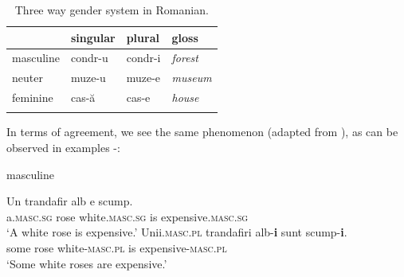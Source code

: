 \begin{table}[!htpb]
  \centering
  \begin{tabular}{llll}
    \lsptoprule
              & singular                   & plural                    & gloss           \\
    \midrule
    masculine & \cellcolor{gray!25}condr-u & condr-i                    & \textit{forest} \\
    neuter    & \cellcolor{gray!25}muze-u  & \cellcolor{gray!25}muze-e & \textit{museum} \\
    feminine  & cas-ă                      & \cellcolor{gray!25}cas-e  & \textit{house}  \\
    \lspbottomrule
  \end{tabular}
  \caption{Three way gender system in Romanian.}\label{tab:gender-rom}
\end{table}

In terms of agreement, we see the same phenomenon (adapted from \citealt{Farkas.1990}), as can be observed in examples -:

\begin{exe}
    \ex \label{romanian-masc-exe} masculine
    \begin{xlist}
        \ex 
        \gll Un trandafir alb e scump.\\
        a.\textsc{masc.sg} rose white.\textsc{masc.sg} is expensive.\textsc{masc.sg}\\
        \glt `A white rose is expensive.'
        \ex 
        \gll Unii.\textsc{masc.pl} trandafiri alb-\textbf{i} sunt scump-\textbf{i}.\\
        some rose white-\textsc{masc.pl} is expensive-\textsc{masc.pl}\\
        \glt `Some white roses are expensive.'
    \end{xlist}
    \end{exe}
    \newpage
    

